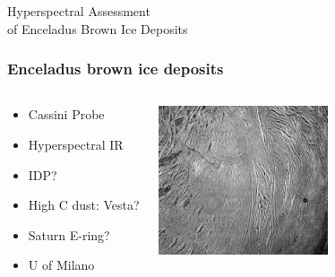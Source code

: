\documentclass[serif,mathserif]{beamer}
\begin{document}

{
\begin{frame}[plain]
\begin{shaded}
Hyperspectral Assessment\\ of Enceladus Brown Ice Deposits
\end{shaded}
\end{frame}}


\begin{frame}
  \frametitle{Enceladus brown ice deposits}
\begin{columns}
\begin{center}
\begin{itemize}
 \item Cassini Probe
 \item Hyperspectral IR
 \item IDP? 
 \item High C dust: Vesta?
 \item Saturn E-ring?
 \item U of Milano
\end{itemize}
\end{center}

\begin{center}
 \includegraphics[width=5cm]{Enceladus2}
\end{center}
\end{columns}
\end{frame}
\end{document}
